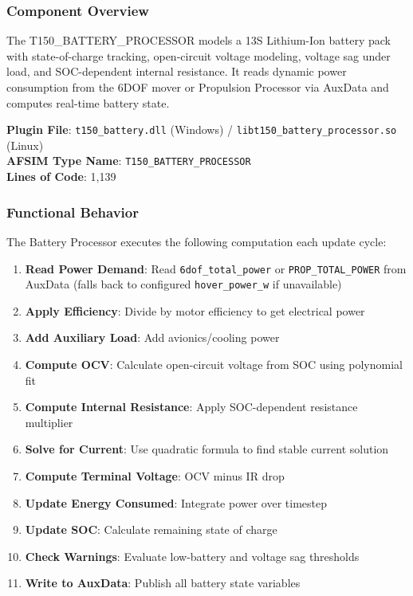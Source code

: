 \subsubsection{\unclass Component Overview}\label{sec:BatteryOverview}

\unclass The T150\_BATTERY\_PROCESSOR models a 13S Lithium-Ion battery pack with state-of-charge tracking, open-circuit voltage modeling, voltage sag under load, and SOC-dependent internal resistance. It reads dynamic power consumption from the 6DOF mover or Propulsion Processor via AuxData and computes real-time battery state.

\unclass \textbf{Plugin File}: \texttt{t150\_battery.dll} (Windows) / \texttt{libt150\_battery\_processor.so} (Linux)\\
\textbf{AFSIM Type Name}: \texttt{T150\_BATTERY\_PROCESSOR}\\
\textbf{Lines of Code}: 1,139

\subsubsection{\unclass Functional Behavior}\label{sec:BatteryFunctionalBehavior}

\unclass The Battery Processor executes the following computation each update cycle:

\begin{enumerate}
	\item \unclass \textbf{Read Power Demand}: Read \texttt{6dof\_total\_power} or \texttt{PROP\_TOTAL\_POWER} from AuxData (falls back to configured \texttt{hover\_power\_w} if unavailable)
	\item \unclass \textbf{Apply Efficiency}: Divide by motor efficiency to get electrical power
	\item \unclass \textbf{Add Auxiliary Load}: Add avionics/cooling power
	\item \unclass \textbf{Compute OCV}: Calculate open-circuit voltage from SOC using polynomial fit
	\item \unclass \textbf{Compute Internal Resistance}: Apply SOC-dependent resistance multiplier
	\item \unclass \textbf{Solve for Current}: Use quadratic formula to find stable current solution
	\item \unclass \textbf{Compute Terminal Voltage}: OCV minus IR drop
	\item \unclass \textbf{Update Energy Consumed}: Integrate power over timestep
	\item \unclass \textbf{Update SOC}: Calculate remaining state of charge
	\item \unclass \textbf{Check Warnings}: Evaluate low-battery and voltage sag thresholds
	\item \unclass \textbf{Write to AuxData}: Publish all battery state variables
\end{enumerate}

